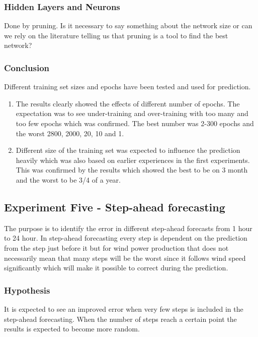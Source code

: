 \subsubsection{Hidden Layers and Neurons}
Done by pruning. Is it necessary to say something about the network size or can we rely on the literature telling us that pruning is a tool to find the best network?

\subsubsection{Conclusion}
Different training set sizes and epochs have been tested and used for prediction.

\begin{enumerate}
\item The results clearly showed the effects of different number of epochs. The expectation was to see under-training and over-training with too many and too few epochs which was confirmed. The best number was 2-300 epochs and the worst 2800, 2000, 20, 10 and 1.
\item Different size of the training set was expected to influence the prediction heavily which was also based on earlier experiences in the first experiments. This was confirmed by the results which showed the best to be on 3 month and the worst to be 3/4 of a year. 
\end{enumerate}

\subsection{Experiment Five - Step-ahead forecasting}
The purpose is to identify the error in different step-ahead forecasts from 1 hour to 24 hour. In step-ahead forecasting every step is dependent on the prediction from the step just before it but for wind power production that does not necessarily mean that many steps will be the worst since it follows wind speed significantly which will make it possible to correct during the prediction.

\subsubsection{Hypothesis}
It is expected to see an improved error when very few steps is included in the step-ahead forecasting. When the number of steps reach a certain point the results is expected to become more random.

